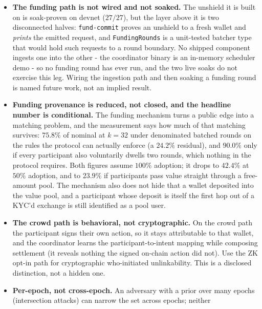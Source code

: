 \documentclass[10pt]{article}
\newcommand{\code}[1]{\texttt{#1}}
\begin{document}
\begin{itemize}[leftmargin=1.4em,itemsep=0.15em]
        synthetic populations, a modeled Zipf common-funder distribution, and a
        modeled funding trace, not a live pool. A live-provenance loader is a named
        roadmap item.
  \item \textbf{The funding path is not wired and not soaked.} The unshield it is
        built on is soak-proven on devnet ($27/27$), but the layer above it is two
        disconnected halves: \code{fund-commit} proves an unshield to a fresh
        wallet and \emph{prints} the emitted request, and \code{FundingRounds} is a
        unit-tested batcher type that would hold such requests to a round boundary.
        No shipped component ingests one into the other - the coordinator binary is
        an in-memory scheduler demo - so no funding round has ever run, and the two
        live soaks do not exercise this leg. Wiring the ingestion path and then
        soaking a funding round is named future work, not an implied result.
  \item \textbf{Funding provenance is reduced, not closed, and the headline number
        is conditional.} The funding mechanism turns a public edge into a matching
        problem, and the measurement says how much of that matching survives:
        $75.8\%$ of nominal at $k{=}32$ under denominated batched rounds on the
        rules the protocol can actually enforce (a $24.2\%$ residual), and $90.0\%$
        only if every participant also voluntarily dwells two rounds, which nothing
        in the protocol requires. Both figures assume $100\%$ adoption; it drops to
        $42.4\%$ at $50\%$ adoption, and to $23.9\%$ if participants pass value
        straight through a free-amount pool. The mechanism also does not hide that a
        wallet deposited into the value pool, and a participant whose deposit is
        itself the first hop out of a KYC'd exchange is still identified as a pool
        user.
  \item \textbf{The crowd path is behavioral, not cryptographic.} On the crowd
        path the participant signs their own action, so it stays attributable to
        that wallet, and the coordinator learns the participant-to-intent mapping
        while composing settlement (it reveals nothing the signed on-chain action
        did not). Use the ZK opt-in path for cryptographic who-initiated
        unlinkability. This is a disclosed distinction, not a hidden one.
  \item \textbf{Per-epoch, not cross-epoch.} An adversary with a prior over many
        epochs (intersection attacks) can narrow the set across epochs; neither

\end{itemize}
\end{document}
